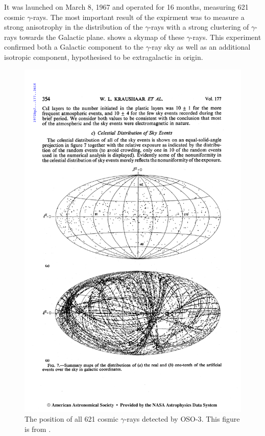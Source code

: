 It was launched on March 8, 1967 and operated for 16 months, measuring
621 cosmic $\gamma$-rays.  The most important result of the expirment was
to measure a strong anisotrophy in the distribution of the $\gamma$-rays
with a strong clustering of $\gamma$-rays towards the Galactic plane.
 shows a skymap of these $\gamma$-rays.  This
experiment confirmed both a Galactic component to the $\gamma$-ray
sky as well as an additional isotropic component, hypothesised to be
extragalactic in origin.


\begin{figure}[htb]
\includegraphics{chapters/introduction/figures/kraushaar_et_al_1972_skymap.pdf}
\caption{The position of all 621 cosmic $\gamma$-rays
detected by \ac{OSO-3}. This figure is from 
\cite{kraushaar_1972_high-energy-cosmic}. }
\end{figure}



